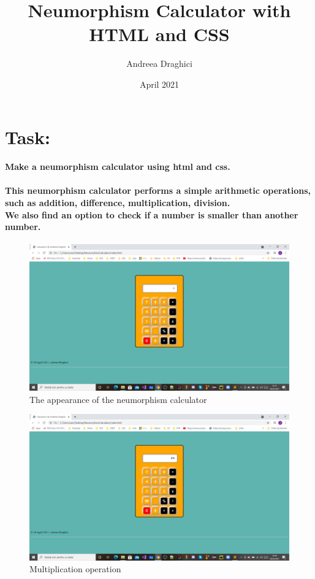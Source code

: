 \documentclass{article}
\title{Neumorphism Calculator with HTML and CSS}
\author{Andreea Draghici }
\date{April 2021}
\begin{document}
\maketitle
\section{Task:}
\paragraph{Make a neumorphism calculator using html and css.}
\paragraph{This neumorphism calculator performs a simple arithmetic operations, such as addition, difference, multiplication, division.\\
We also find an option to check if a number is smaller than another number.}
\begin{figure}[h]
    \centering
    \includegraphics[width=15cm]{first.png}
    \caption{The appearance of the neumorphism calculator }
    \label{first.png}
\end{figure}
\newpage
\begin{figure}[h]
    \centering
    \includegraphics[width=15cm]{inmultire.png}
    \caption{Multiplication operation}
    \label{inmultire.png}
\end{figure}
\end{document}
